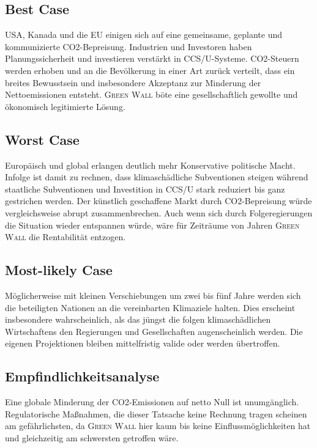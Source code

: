 \subsection{Best Case}

USA, Kanada und die EU einigen sich auf eine gemeinsame, geplante und kommunizierte CO2-Bepreisung.
Industrien und Investoren haben Planungssicherheit und investieren verstärkt in CCS/U-Systeme.
CO2-Steuern werden erhoben und an die Bevölkerung in einer Art zurück verteilt, dass ein breites Bewusstsein und insbesondere Akzeptanz zur Minderung der Nettoemissionen entsteht.
\textsc{Green Wall} böte eine gesellschaftlich gewollte und ökonomisch legitimierte Lösung.

\subsection{Worst Case}

Europäisch und global erlangen deutlich mehr Konservative politische Macht.
Infolge ist damit zu rechnen, dass klimaschädliche Subventionen steigen während staatliche Subventionen und Investition in CCS/U stark reduziert bis ganz gestrichen werden.
Der künstlich geschaffene Markt durch CO2-Bepreisung würde vergleichsweise abrupt zusammenbrechen.
Auch wenn sich durch Folgeregierungen die Situation wieder entspannen würde, wäre für Zeiträume von Jahren \textsc{Green Wall} die Rentabilität entzogen.

\subsection{Most-likely Case}

Möglicherweise mit kleinen Verschiebungen um zwei bis fünf Jahre werden sich die beteiligten Nationen an die vereinbarten Klimaziele halten.
Dies erscheint insbesondere wahrscheinlich, als das jüngst die folgen klimaschädlichen Wirtschaftens den Regierungen und Gesellschaften augenscheinlich werden.
Die eigenen Projektionen bleiben mittelfristig valide oder werden übertroffen.

\subsection{Empfindlichkeitsanalyse}

Eine globale Minderung der CO2-Emissionen auf netto Null ist unumgänglich.
Regulatorische Maßnahmen, die dieser Tatsache keine Rechnung tragen scheinen am gefährlichsten, da \textsc{Green Wall} hier kaum bis keine Einflussmöglichkeiten hat und gleichzeitig am schwersten getroffen wäre.\par\medskip
%


